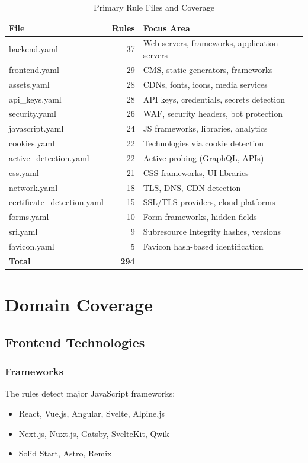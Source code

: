 \documentclass[11pt,a4paper,oneside]{article}
\begin{document}
\begin{table}[H]
\centering
\caption{Primary Rule Files and Coverage}
\label{tab:primary_rules}
\begin{tabular}{|l|r|p{5cm}|}
\hline
\textbf{File} & \textbf{Rules} & \textbf{Focus Area} \\
\hline
backend.yaml & 37 & Web servers, frameworks, application servers \\
frontend.yaml & 29 & CMS, static generators, frameworks \\
assets.yaml & 28 & CDNs, fonts, icons, media services \\
api\_keys.yaml & 28 & API keys, credentials, secrets detection \\
security.yaml & 26 & WAF, security headers, bot protection \\
javascript.yaml & 24 & JS frameworks, libraries, analytics \\
cookies.yaml & 22 & Technologies via cookie detection \\
active\_detection.yaml & 22 & Active probing (GraphQL, APIs) \\
css.yaml & 21 & CSS frameworks, UI libraries \\
network.yaml & 18 & TLS, DNS, CDN detection \\
certificate\_detection.yaml & 15 & SSL/TLS providers, cloud platforms \\
forms.yaml & 10 & Form frameworks, hidden fields \\
sri.yaml & 9 & Subresource Integrity hashes, versions \\
favicon.yaml & 5 & Favicon hash-based identification \\
\hline
\textbf{Total} & \textbf{294} & \\
\hline
\end{tabular}
\end{table}

\section{Domain Coverage}

\subsection{Frontend Technologies}
\subsubsection{Frameworks}
The rules detect major JavaScript frameworks:
\begin{itemize}
    \item React, Vue.js, Angular, Svelte, Alpine.js
    \item Next.js, Nuxt.js, Gatsby, SvelteKit, Qwik
    \item Solid Start, Astro, Remix
\end{itemize}
\end{document}
